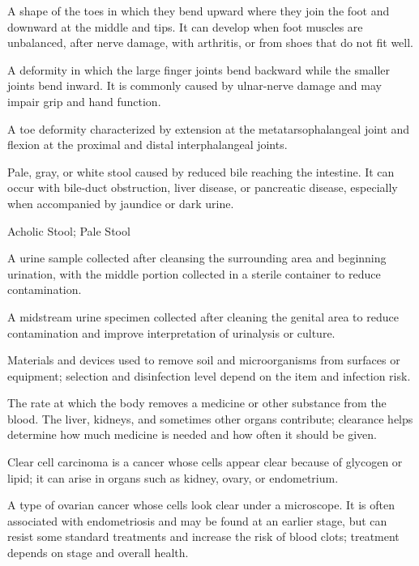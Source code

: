  A shape of the toes in which they bend upward where they join the foot and downward at the middle and tips. It can develop when foot muscles are unbalanced, after nerve damage, with arthritis, or from shoes that do not fit well.

 A deformity in which the large finger joints bend backward while the smaller joints bend inward. It is commonly caused by ulnar-nerve damage and may impair grip and hand function.

 A toe deformity characterized by extension at the metatarsophalangeal joint and flexion
at the proximal and distal interphalangeal joints.

 Pale, gray, or white stool caused by reduced bile reaching the intestine. It can occur with bile-duct obstruction, liver disease, or pancreatic disease, especially when accompanied by jaundice or dark urine.

\synonyms
Acholic Stool; Pale Stool

 A urine sample collected after cleansing the surrounding area and beginning urination, with the middle portion collected in a sterile container to reduce contamination.

 A midstream urine specimen collected after cleaning the genital area to reduce contamination and improve interpretation of urinalysis or culture.

 Materials and devices used to remove soil and microorganisms from surfaces or equipment; selection and disinfection level depend on the item and infection risk.

 The rate at which the body removes a medicine or other substance from the blood. The liver, kidneys, and sometimes other organs contribute; clearance helps determine how much medicine is needed and how often it should be given.

 Clear cell carcinoma is a cancer whose cells appear clear because of glycogen or lipid; it can arise in organs such as kidney, ovary, or endometrium.

 A type of ovarian cancer whose cells look clear under a microscope. It is often associated with endometriosis and may be found at an earlier stage, but can resist some standard treatments and increase the risk of blood clots; treatment depends on stage and overall health.

